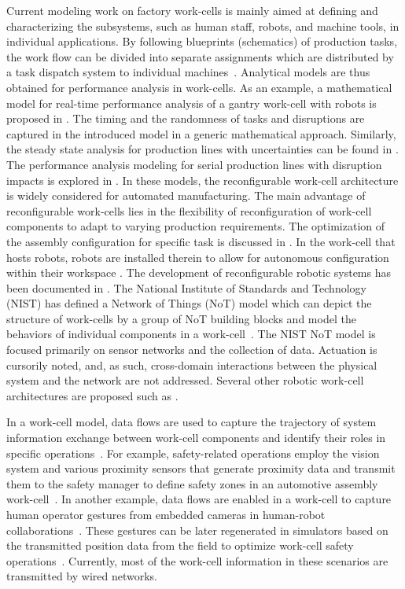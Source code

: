 \documentclass[journal, twoside]{IEEEtran}
\begin{document}
    Current modeling work on factory work-cells is mainly aimed at defining and characterizing the subsystems, such as human staff, robots, and machine tools, in individual applications. By following blueprints (schematics) of production tasks, the work flow can be divided into separate assignments which are distributed by a task dispatch system to individual machines~\cite{IkeaBot}. Analytical models are thus obtained for performance analysis in work-cells. As an example, a mathematical model for real-time performance analysis of a gantry work-cell with robots is proposed in \cite{8098604,OU2017212}. The timing and the randomness of tasks and disruptions are captured in the introduced model in a generic mathematical approach. Similarly, the steady state analysis for production lines with uncertainties can be found in \cite{Colledani2013,doi:10.1080/00207543.2012.713137,doi:10.1080/00207540500385980}. The performance analysis modeling for serial production lines with disruption impacts is explored in \cite{QChang,Liu2012}. 
In these models, the reconfigurable work-cell architecture is widely considered for automated manufacturing. The main advantage of reconfigurable work-cells lies in the flexibility of reconfiguration of work-cell components to adapt to varying production requirements. The optimization of the assembly configuration for specific task is discussed in \cite{CHEN2001199}. In the work-cell that hosts robots, robots are installed therein to allow for autonomous configuration within their workspace \cite{8023523,10.1007/978-3-319-65151-4_10,6059204}. The development of reconfigurable robotic systems has been documented in \cite{Fulea}. The National Institute of Standards and Technology (NIST) has defined a Network of Things (NoT) model which can depict the structure of work-cells by a group of NoT building blocks and model the behaviors of individual components in a work-cell~\cite{NIST800-183}.  The NIST NoT model is focused primarily on sensor networks and the collection of data.  Actuation is cursorily noted, and, as such, cross-domain interactions between the physical system and the network are not addressed. Several other robotic work-cell architectures are proposed such as \cite{OpenArch,CARPANZANO2007435}. 

In a work-cell model, data flows are used to capture the trajectory of system information exchange between work-cell components and identify their roles in specific operations~\cite{CARPANZANO2007435}. 
For example, safety-related operations employ the vision system and various proximity sensors that generate proximity data and transmit them to the safety manager to define safety zones in an automotive assembly work-cell~\cite{safeeye}. 
In another example, data flows are enabled in a work-cell to capture human operator gestures from embedded cameras in human-robot collaborations~\cite{cobotcell}. These gestures can be later regenerated in simulators based on the transmitted position data from the field to optimize work-cell safety operations~\cite{gesture}. Currently, most of the work-cell information in these scenarios are transmitted by wired networks.
\end{document}
